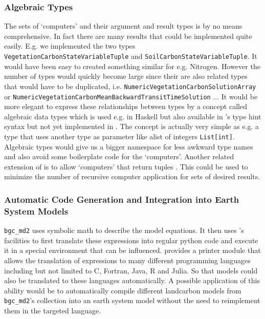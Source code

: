 \subsubsection{Algebraic Types}
The sets of `computers' and their argument and result types is by no means comprehensive.
In fact there are many results that could be implemented quite easily. 
E.g. we implemented the two types \texttt{VegetationCarbonStateVariableTuple} and 
\texttt{SoilCarbonStateVariableTuple}. It would have been easy to created something similar for e.g. Nitrogen. However the number of types would quickly become large since their
are also related types that would have to be duplicated, i.e. \texttt{NumericVegetationCarbonSolutionArray} or \texttt{NumericVegetationCarbonMeanBackwardTransitTimeSolution} ...
It would be more elegant to express these relationships between types by a concept called
algebraic data types which is used e.g. in  Haskell but also available in \python 's type hint syntax but not yet implemented in \ComputabilityGraphs.
The concept is actually very simple as e.g. a type that uses another type as parameter like alist of integers \texttt{List[int]}. Algebraic types would give us a bigger namespace for less awkward type names and also avoid some boilerplate code for the `computers'.
Another related extension of \ComputabilityGraphs is to allow `computers' that return tuples . 
This could be used to minimize the number of recursive computer application for sets of desired results.   

\subsubsection{Automatic Code Generation and Integration into Earth System Models}
\texttt{bgc\_md2} uses symbolic math to describe the model equations. It then
uses \sympy's facilities to first translate these expressions into regular python code and execute it in a special environment that can be influenced.
\sympy provides a printer module that allows the translation of \sympy expressions to many different programming languages including but not limited to C, Fortran, Java, R and Julia.
So that models could also be translated to these languages automatically. 
A possible application of this ability would be to automatically compile different landcarbon models from \texttt{bgc\_md2}'s collection into an earth system model without the need to reimplement them in the targeted language. 



